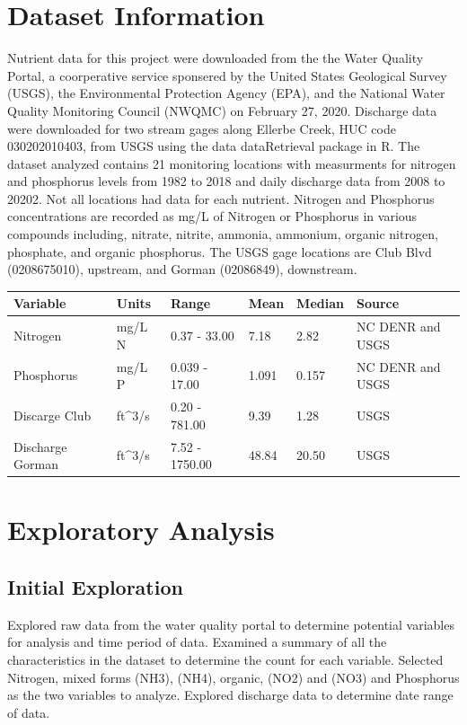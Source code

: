 \documentclass[12pt,]{article}
\begin{document}
\hypertarget{dataset-information}{%
\section{Dataset Information}\label{dataset-information}}

Nutrient data for this project were downloaded from the the Water
Quality Portal, a coorperative service sponsered by the United States
Geological Survey (USGS), the Environmental Protection Agency (EPA), and
the National Water Quality Monitoring Council (NWQMC) on February 27,
2020. Discharge data were downloaded for two stream gages along Ellerbe
Creek, HUC code 030202010403, from USGS using the data dataRetrieval
package in R. The dataset analyzed contains 21 monitoring locations with
measurments for nitrogen and phosphorus levels from 1982 to 2018 and
daily discharge data from 2008 to 20202. Not all locations had data for
each nutrient. Nitrogen and Phosphorus concentrations are recorded as
mg/L of Nitrogen or Phosphorus in various compounds including, nitrate,
nitrite, ammonia, ammonium, organic nitrogen, phosphate, and organic
phosphorus. The USGS gage locations are Club Blvd (0208675010),
upstream, and Gorman (02086849), downstream.

\begin{longtable}[]{@{}llllll@{}}
\toprule
Variable & Units & Range & Mean & Median & Source\tabularnewline
\midrule
\endhead
Nitrogen & mg/L N & 0.37 - 33.00 & 7.18 & 2.82 & NC DENR and
USGS\tabularnewline
Phosphorus & mg/L P & 0.039 - 17.00 & 1.091 & 0.157 & NC DENR and
USGS\tabularnewline
Discarge Club & ft\^{}3/s & 0.20 - 781.00 & 9.39 & 1.28 &
USGS\tabularnewline
Discharge Gorman & ft\^{}3/s & 7.52 - 1750.00 & 48.84 & 20.50 &
USGS\tabularnewline
\bottomrule
\end{longtable}

\newpage

\hypertarget{exploratory-analysis}{%
\section{Exploratory Analysis}\label{exploratory-analysis}}

\hypertarget{initial-exploration}{%
\subsection{Initial Exploration}\label{initial-exploration}}

Explored raw data from the water quality portal to determine potential
variables for analysis and time period of data. Examined a summary of
all the characteristics in the dataset to determine the count for each
variable. Selected Nitrogen, mixed forms (NH3), (NH4), organic, (NO2)
and (NO3) and Phosphorus as the two variables to analyze. Explored
discharge data to determine date range of data.
\end{document}
